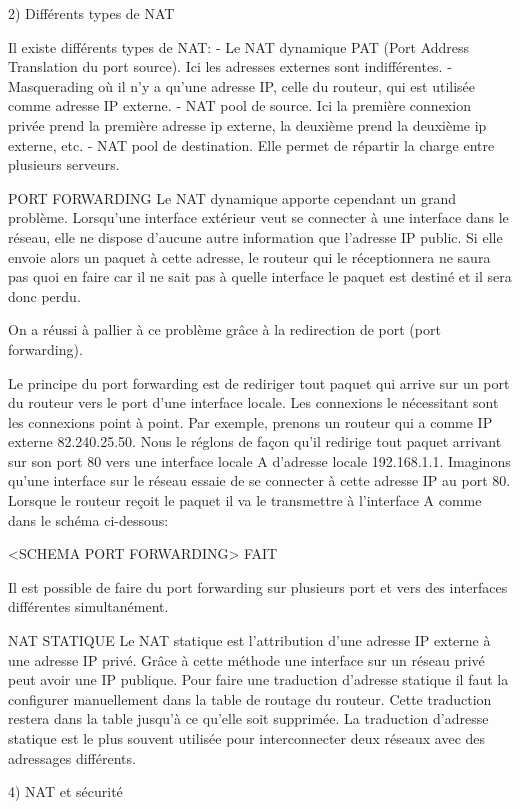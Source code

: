 2) Différents types de NAT

Il existe différents types de NAT:
- Le NAT dynamique PAT (Port Address Translation du port source). Ici les
adresses externes sont indifférentes.
- Masquerading où il n'y a qu'une adresse IP, celle du routeur, qui est
utilisée comme adresse IP externe.
- NAT pool de source. Ici la première connexion privée prend la première
adresse ip externe, la deuxième prend la deuxième ip externe, etc.
- NAT pool de destination. Elle permet de répartir la charge entre plusieurs
serveurs.

PORT FORWARDING
Le NAT dynamique apporte cependant un grand problème. Lorsqu'une interface
extérieur veut se connecter à une interface dans le réseau, elle ne dispose
d'aucune autre information que l'adresse IP public. Si elle envoie alors un
paquet à cette adresse, le routeur qui le réceptionnera ne saura pas quoi en
faire car il ne sait pas à quelle interface le paquet est destiné et il sera
donc perdu. 

On a réussi à pallier à ce problème grâce à la redirection de port (port 
forwarding). 

Le principe du port forwarding est de rediriger tout paquet qui arrive sur un
port du routeur vers le port d'une interface locale. Les connexions le
nécessitant sont les connexions point à point.
Par exemple, prenons un routeur qui a comme IP externe 82.240.25.50.
Nous le réglons de façon qu'il redirige tout paquet arrivant sur son port 80
vers une interface locale A d'adresse locale 192.168.1.1.
Imaginons qu'une interface sur le réseau essaie de se connecter à cette adresse
 IP au port 80.
Lorsque le routeur reçoit le paquet il va le transmettre à l'interface A comme
dans le schéma ci-dessous:

<SCHEMA PORT FORWARDING> FAIT

Il est possible de faire du port forwarding sur plusieurs port et vers des
interfaces différentes simultanément.

NAT STATIQUE
Le NAT statique est l'attribution d'une adresse IP externe à une adresse IP 
privé. Grâce à cette méthode une interface sur un réseau privé peut avoir une
IP publique. Pour faire une traduction d'adresse statique il faut la configurer
manuellement dans la table de routage du routeur. Cette traduction restera dans
la table jusqu'à ce qu'elle soit supprimée. La traduction d'adresse statique
est le plus souvent utilisée pour interconnecter deux réseaux avec des
adressages différents.

4) NAT et sécurité


